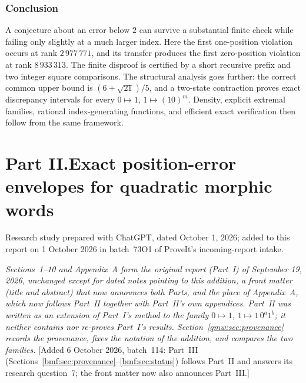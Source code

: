 \documentclass[11pt]{article}
\numberwithin{equation}{section}
\theoremstyle{definition}
\theoremstyle{remark}
\begin{document}
\section{Conclusion}
A conjecture about an error below $2$ can survive a substantial finite
check while failing only slightly at a much larger index. Here the first
one-position violation occurs at rank $2\,977\,771$, and its transfer
produces the first zero-position violation at rank $8\,933\,313$.
The finite disproof is certified by a short recursive prefix and two
integer square comparisons. The structural analysis goes further: the
correct common upper bound is $(6+\sqrt{21})/5$, and a two-state contraction
proves exact discrepancy intervals for every $0\mapsto1$,
$1\mapsto(10)^m$. Density, explicit extremal families, rational
index-generating functions, and efficient exact verification then follow
from the same framework.

\clearpage
{}\part*{Part II.\quad Exact position-error envelopes for quadratic morphic words}
\setcounter{table}{0}
\renewcommand{\thetable}{II.\arabic{table}}
\renewcommand{\theHtable}{II.\arabic{table}}

\par\smallskip
\noindent Research study prepared with ChatGPT, dated October 1, 2026;
added to this report on 1 October 2026 in batch~73O1 of ProveIt's
incoming-report intake.\par\medskip

\noindent\emph{Sections~1--10 and Appendix~A form the original report
(Part~I) of September 19, 2026, unchanged except for dated notes pointing to
this addition, a front matter (title and abstract) that now announces both
Parts, and the place of Appendix~A, which now follows Part~II together with
Part~II's own appendices. Part~II was written as an extension of Part~I's
method to the family $0\mapsto1$, $1\mapsto1\,0^a1^b$; it neither contains
nor re-proves Part~I's results. Section~\ref{qmw:sec:provenance} records the
provenance, fixes the notation of the addition, and compares the two
families.}
[Added 6 October 2026, batch~114: Part~III
(Sections~\ref{bmf:sec:provenance}--\ref{bmf:sec:status}) follows Part~II
and answers its research question~7; the front matter now also announces
Part~III.]
\end{document}
